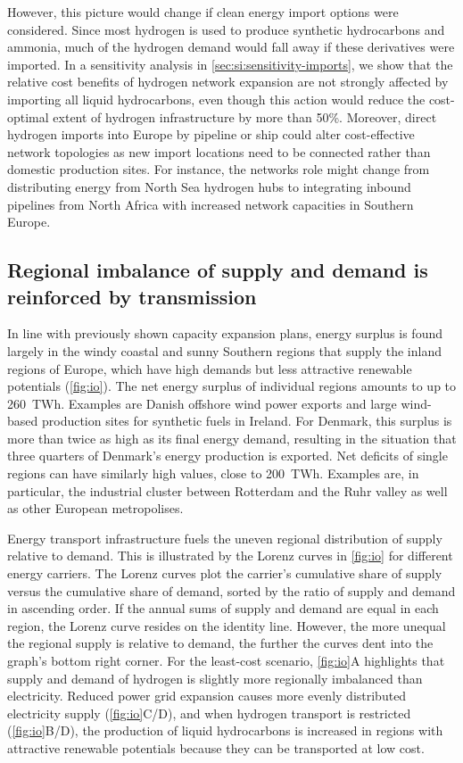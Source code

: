 However, this picture would change if clean energy import options were
considered. Since most hydrogen is used to produce synthetic hydrocarbons and
ammonia, much of the hydrogen demand would fall away if these derivatives were
imported. In a sensitivity analysis in \cref{sec:si:sensitivity-imports}, we
show that the relative cost benefits of hydrogen network expansion are not
strongly affected by importing all liquid hydrocarbons, even though this action
would reduce the cost-optimal extent of hydrogen infrastructure by more than
50\%. Moreover, direct hydrogen imports into Europe by pipeline or ship could
alter cost-effective network topologies as new import locations need to be
connected rather than domestic production sites. For instance, the networks role
might change from distributing energy from North Sea hydrogen hubs to
integrating inbound pipelines from North Africa with increased network
capacities in Southern Europe.\cite{wetzelGreenEnergy2023a}

\subsection*{Regional imbalance of supply and demand is reinforced by transmission}
\label{sec:imbalance}

In line with previously shown capacity expansion plans, energy surplus is found
largely in the windy coastal and sunny Southern regions that supply the inland
regions of Europe, which have high demands but less attractive renewable
potentials (\cref{fig:io}). The net energy surplus of individual regions amounts
to up to 260~TWh. Examples are Danish offshore wind power exports and large
wind-based production sites for synthetic fuels in Ireland. For Denmark, this
surplus is more than twice as high as its final energy demand, resulting in the
situation that three quarters of Denmark's energy production is exported. Net
deficits of single regions can have similarly high values, close to 200~TWh.
Examples are, in particular, the industrial cluster between Rotterdam and the
Ruhr valley as well as other European metropolises.

Energy transport infrastructure fuels the uneven regional distribution of supply
relative to demand. This is illustrated by the Lorenz curves in \cref{fig:io}
for different energy carriers. The Lorenz curves plot the carrier's cumulative
share of supply versus the cumulative share of demand, sorted by the ratio of
supply and demand in ascending order. If the annual sums of supply and demand
are equal in each region, the Lorenz curve resides on the identity line.
However, the more unequal the regional supply is relative to demand, the further
the curves dent into the graph's bottom right corner. For the least-cost
scenario, \cref{fig:io}A highlights that supply and demand of hydrogen
is slightly more regionally imbalanced than electricity. Reduced power grid
expansion causes more evenly distributed electricity supply
(\cref{fig:io}C/D), and when hydrogen transport is
restricted (\cref{fig:io}B/D), the production of
liquid hydrocarbons is increased in regions with attractive renewable potentials
because they can be transported at low cost.
